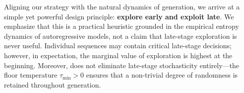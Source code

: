 %
Aligning our strategy with the natural dynamics of generation, we arrive at a simple yet powerful design principle: \textbf{explore early and exploit late}. We emphasize that this is a practical heuristic grounded in the empirical entropy dynamics of autoregressive models, not a claim that late-stage exploration is never useful. Individual sequences may contain critical late-stage decisions; however, in expectation, the marginal value of exploration is highest at the beginning. Moreover, \alg does not eliminate late-stage stochasticity entirely---the floor temperature $\tau_{\min} > 0$ ensures that a non-trivial degree of randomness is retained throughout generation.

%

%

